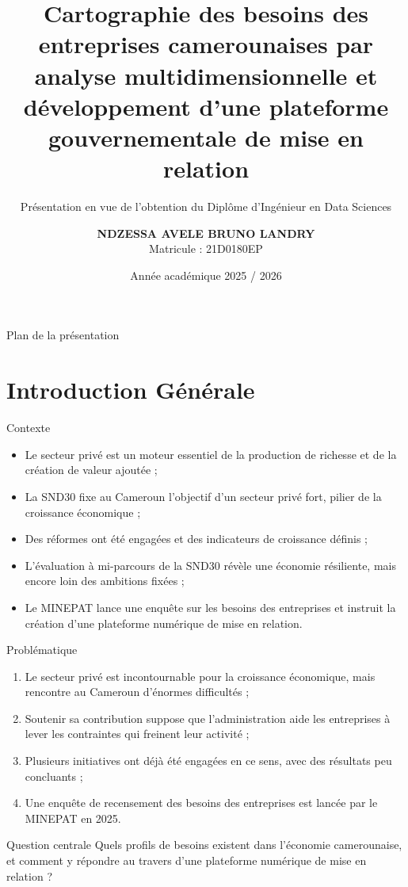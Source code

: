 \documentclass[aspectratio=169, 10pt]{beamer}
\title[Cartographie des besoins des entreprises camerounaises par analyse multidimensionnelle et développement d'une plateforme gouvernementale de mise en relation]{%
    Cartographie des besoins des entreprises camerounaises par analyse multidimensionnelle et développement d'une plateforme gouvernementale de mise en relation}
\subtitle{Présentation en vue de l'obtention du Diplôme d'Ingénieur en Data Sciences}
\author[NDZESSA AVELE Bruno Landry]{%
    \textbf{NDZESSA AVELE BRUNO LANDRY}\\
    \small Matricule : 21D0180EP}
\institute[ENSPM — Maroua]{%
    École Nationale Supérieure Polytechnique de Maroua\\
    Département d'Informatique et Télécommunications\\[4pt]
    \small Directeur : Pr Mohamadou Alidou\\
    Encadreur académique : Pr Kaladzavi\\
    Encadreur professionnel : M. Abdoulaziz Junmbe
    }
\date{Année académique 2025 / 2026}
\begin{document}
\begin{frame}[plain]
    \titlepage
\end{frame}

\begin{frame}{Plan de la présentation}
    \tableofcontents[hideallsubsections]
\end{frame}

\section{Introduction Générale}
\begin{frame}{Contexte}
    \begin{itemize}
        \item Le secteur privé est un moteur essentiel de la production de richesse et de la création de valeur ajoutée ;
        \item La SND30 fixe au Cameroun l'objectif d'un secteur privé fort, pilier de la croissance économique ;
        \item Des réformes ont été engagées et des indicateurs de croissance définis ;
        \item L'évaluation à mi-parcours de la SND30 révèle une économie résiliente, mais encore loin des ambitions fixées ;
        \item Le MINEPAT lance une enquête sur les besoins des entreprises et instruit la création d'une plateforme numérique de mise en relation.
    \end{itemize}
\end{frame}

\begin{frame}{Problématique}
    \begin{enumerate}
        \item Le secteur privé est incontournable pour la croissance économique, mais rencontre au Cameroun d'énormes difficultés ;
        \item Soutenir sa contribution suppose que l'administration aide les entreprises à lever les contraintes qui freinent leur activité ;
        \item Plusieurs initiatives ont déjà été engagées en ce sens, avec des résultats peu concluants ;
        \item Une enquête de recensement des besoins des entreprises est lancée par le MINEPAT en 2025.
    \end{enumerate}
    \vspace{6pt}
    \begin{alertblock}{Question centrale}
        Quels profils de besoins existent dans l'économie camerounaise, et comment y répondre au travers d'une plateforme numérique de mise en relation ?
    \end{alertblock}
\end{frame}
\end{document}
